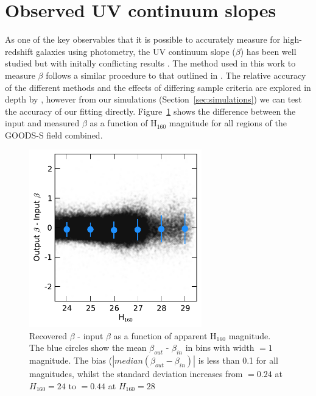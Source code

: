 \section{Observed UV continuum slopes}\label{app:beta}
As one of the key observables that it is possible to accurately measure for high-redshift galaxies using photometry, the UV continuum slope ($\beta$) has been well studied but with initally conflicting results \citep{Dunlop:2011jl,Wilkins:2011fs,2012ApJ...754...83B,Finkelstein:2012hr,2013MNRAS.429.2456R,Bouwens:2013vf}. The method used in this work to measure $\beta$ follows a similar procedure to that outlined in \citet{Finkelstein:2012hr}. The relative accuracy of the different methods and the effects of differing sample criteria are explored in depth by \citet{2013MNRAS.429.2456R}, however from our simulations (Section~\ref{sec:simulations}) we can test the accuracy of our fitting directly. Figure~\ref{fig:betacomparison} shows the difference between the input and measured $\beta$ as a function of H$_{160}$ magnitude for all regions of the GOODS-S field combined.  

\begin{figure}
\centering
\includegraphics[width=75mm]{plots/figB1.pdf}
\caption[Short caption]{Recovered $\beta$ - input $\beta$ as a function of apparent H$_{160}$ magnitude. The blue circles show the mean $\beta_{out}$ - $\beta_{in}$ in bins with width $=1$ magnitude. The bias ($\left | median (\beta_{out}-\beta_{in}) \right |$ is less than 0.1 for all magnitudes, whilst the standard deviation increases from $= 0.24$ at $H_{160} = 24$ to $= 0.44$ at $H_{160} = 28$}
\label{fig:betacomparison}
\end{figure}

